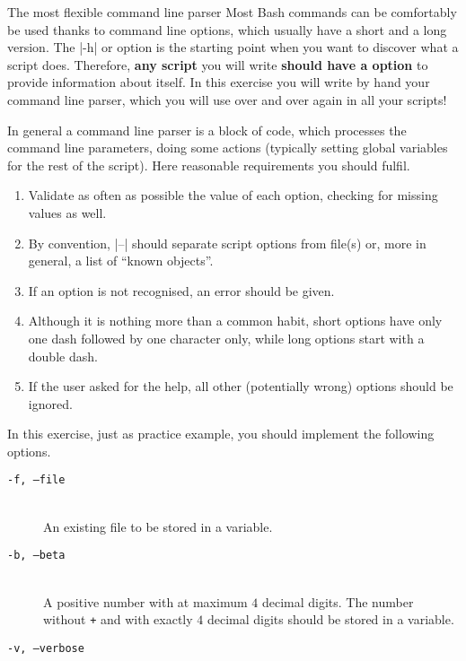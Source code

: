 
\begin{exercise}{The most flexible command line parser}
    Most Bash commands can be comfortably be used thanks to command line options, which usually have a short and a long version.
    The \bash|-h| or  option is the starting point when you want to discover what a script does.
    Therefore, \textbf{any script} you will write \textbf{should have a  option} to provide information about itself.
    In this exercise you will write by hand your command line parser, which you will use over and over again in all your scripts!

    In general a command line parser is a block of code, which processes the command line parameters, doing some actions (typically setting global variables for the rest of the script).
    Here reasonable requirements you should fulfil.
    \begin{enumerate}
        \item Validate as often as possible the value of each option, checking for missing values as well.
        \item By convention, \bash|--| should separate script options from file(s) or, more in general, a list of ``known objects''.
        \item If an option is not recognised, an error should be given.
        \item Although it is nothing more than a common habit, short options have only one dash followed by one character only, while long options start with a double dash.
        \item If the user asked for the help, all other (potentially wrong) options should be ignored.
    \end{enumerate}
    In this exercise, just as practice example, you should implement the following options.
    \begin{description}
        \item[\texttt{-f, --file}] ~\\
            An existing file to be stored in a variable.
        \item[\texttt{-b, --beta}] ~\\
            A positive number with at maximum $4$ decimal digits.
            The number without \texttt{+} and with exactly $4$ decimal digits should be stored in a variable.
        \item[\texttt{-v, --verbose}] ~\\

\end{description}
\end{exercise}
